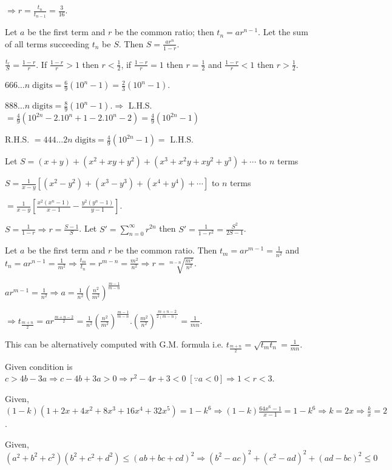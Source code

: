   $\Rightarrow r = \frac{t_n}{t_{n - 1}} = \frac{3}{16}$.
\item Let $a$ be the first term and $r$ be the common ratio; then $t_n = ar^{n -1}$. Let the sum of all
  terms succeeding $t_n$ be $S$. Then $S = \frac{ar^n}{1 - r}$.

  $\frac{t_r}{S} = \frac{1 - r}{r}$. If $\frac{1 - r}{r} > 1$ then $r < \frac{1}{2}$, if $\frac{1 - r}{r} =
  1$ then $r = \frac{1}{2}$ and $\frac{1 - r}{r} < 1$ then $r > \frac{1}{2}$.
\item $666\ldots n\;\mathrm{digits} = \frac{6}{9}(10^n - 1) = \frac{2}{3}(10^n - 1)$.

  $888\ldots n\;\mathrm{digits} = \frac{8}{9}(10^n - 1). \Rightarrow$ L.H.S. $= \frac{4}{9}(10^{2n} - 2.10^n + 1 -
  2.10^n -2) = \frac{4}{9}(10^{2n} - 1)$

  R.H.S. $= 444\ldots 2n\;\mathrm{digits} = \frac{4}{9}(10^{2n} - 1) =$ L.H.S.
\item Let $S = (x + y) + (x^2 + xy + y^2) + (x^3 + x^2y + xy^2 + y^3) + \cdots$ to $n$ terms

  $S = \frac{1}{x - y}[(x^2 - y^2) + (x^3 - y^3) + (x^4 + y^4) + \cdots]$ to $n$ terms

  $= \frac{1}{x - y}\left[\frac{x^2(x^n - 1)}{x - 1} - \frac{y^2(y^n - 1)}{y - 1}\right]$.
\item $S = \frac{1}{1 - r}\Rightarrow r = \frac{S - 1}{S}$. Let $S' =
  \displaystyle\sum_{n=0}^{\infty}r^{2n}$ then
  $S' = \frac{1}{1 - r^2} = \frac{S^2}{2S - 1}$.
\item Let $a$ be the first term and $r$ be the common ratio. Then $t_m = ar^{m - 1} = \frac{1}{n^2}$ and
  $t_n = ar^{n - 1} = \frac{1}{m^2} \Rightarrow \frac{t_m}{t_n} = r^{m - n} = \frac{m^2}{n^2} \Rightarrow r
  = \sqrt[m - n]{\frac{m^2}{n^2}}$.

  $ar^{m - 1} = \frac{1}{n^2} \Rightarrow a = \frac{1}{n^2}\left(\frac{n^2}{m^2}\right)^{\tfrac{m - 1}{m -
      n}}$

  $\Rightarrow t_{\tfrac{m + n}{2}} = ar^{\tfrac{m + n - 2}{2}} =
  \frac{1}{n^2}\left(\frac{n^2}{m^2}\right)^{\tfrac{m - 1}{m - n}}.\left(\frac{m^2}{n^2}\right)^{\tfrac{m +
      n -2}{2(m - n)}} = \frac{1}{mn}$.

  This can be alternatively computed with G.M. formula i.e. $t_{\tfrac{m + n}{2}} = \sqrt{t_mt_n} =
  \frac{1}{mn}$.
\item Given condition is $c > 4b - 3a \Rightarrow c - 4b + 3a > 0 \Rightarrow r^2 - 4r + 3 < 0\;[\because a
  < 0] \Rightarrow 1 < r < 3$.
\item Given, $(1 - k)(1 + 2x + 4x^2 + 8x^3 + 16x^4 + 32x^5) = 1 - k^6 \Rightarrow (1 - k)\frac{64x^6 - 1}{x
  - 1} = 1 - k^6 \Rightarrow k = 2x \Rightarrow \frac{k}{x} = 2$.
\item Given, $(a^2 + b^2 + c^2)(b^2 + c^2 + d^2)\leq(ab + bc + cd)^2 \Rightarrow (b^2 - ac)^2 + (c^2 - ad)^2
  + (ad - bc)^2 \leq 0$

